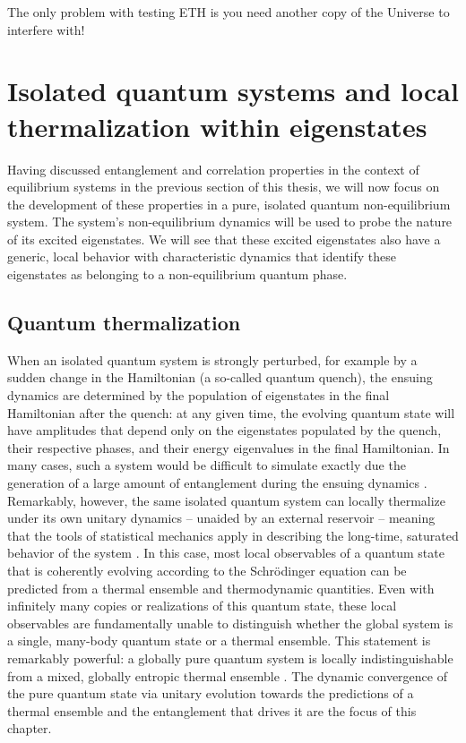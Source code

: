 \begin{savequote}[75mm]
The only problem with testing ETH is you need another copy of the Universe to interfere with!
\end{savequote}

\chapter{Isolated quantum systems and \newline local thermalization within eigenstates}
\label{sec:ch4}

Having discussed entanglement and correlation properties in the context of equilibrium systems in the previous section of this thesis, we will now focus on the development of these properties in a pure, isolated quantum non-equilibrium system. The system's non-equilibrium dynamics will be used to probe the nature of its excited eigenstates. We will see that these excited eigenstates also have a generic, local behavior with characteristic dynamics that identify these eigenstates as belonging to a non-equilibrium quantum phase.

\section{Quantum thermalization}

When an isolated quantum system is strongly perturbed, for example by a sudden change in the Hamiltonian (a so-called quantum quench), the ensuing dynamics are determined by the population of eigenstates in the final Hamiltonian after the quench:\cite{Sakurai1993} at any given time, the evolving quantum state will have amplitudes that depend only on the eigenstates populated by the quench, their respective phases, and their energy eigenvalues in the final Hamiltonian. In many cases, such a system would be difficult to simulate exactly due the generation of a large amount of entanglement during the ensuing dynamics \cite{Calabrese2005,Amico2008,Daley2012,Schachenmayer2013}. Remarkably, however, the same isolated quantum system can locally thermalize under its own unitary dynamics -- unaided by an external reservoir -- meaning that the tools of statistical mechanics apply in describing the long-time, saturated behavior of the system \cite{Deutsch1991,Rigol2008,Eisert2015}. In this case, most local observables of a quantum state that is coherently evolving according to the Schr\"odinger equation can be predicted from a thermal ensemble and thermodynamic quantities. Even with infinitely many copies or realizations of this quantum state, these local observables are fundamentally unable to distinguish whether the global system is a single, many-body quantum state or a thermal ensemble. This statement is remarkably powerful: a globally pure quantum system is locally indistinguishable from a mixed, globally entropic thermal ensemble \cite{Jensen1985,Deutsch1991,Srednicki1994,Rigol2008}. The dynamic convergence of the pure quantum state via unitary evolution towards the predictions of a thermal ensemble and the entanglement that drives it are the focus of this chapter.

